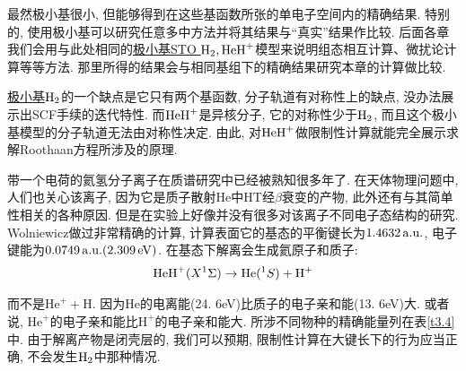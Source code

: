 最然极小基很小, 
但能够得到在这些基函数所张的单电子空间内的精确结果. 
特别的, 
使用极小基可以研究任意多中方法并将其结果与``真实''结果作比较. 
后面各章我们会用与此处相同的\underline{极小基STO $\mathrm{H}_2,\mathrm{HeH}^+$}模型来说明组态相互计算、微扰论计算等等方法. 
那里所得的结果会与相同基组下的精确结果研究本章的\hft 计算做比较.


\underline{极小基$\mathrm{H}_2$}的一个缺点是它只有两个基函数, 
分子轨道有对称性上的缺点, 没办法展示出SCF手续的迭代特性. 
而$\mathrm{HeH}^+$是异核分子, 它的对称性少于$\mathrm{H}_2$, 而且这个极小基模型的分子轨道无法由对称性决定. 
由此, 对$\mathrm{HeH}^+$做限制性\hft 计算就能完全展示求解Roothaan方程所涉及的原理. 

带一个电荷的氦氢分子离子在质谱研究中已经被熟知很多年了. 在天体物理问题中, 人们也关心该离子, 因为它是质子散射$\mathrm{He}$中$\mathrm{HT}$经$\beta$衰变的产物, 此外还有与其简单性相关的各种原因. 但是在实验上好像并没有很多对该离子不同电子态结构的研究. Wolniewicz做过非常精确的计算, 计算表面它的基态的平衡键长为$1.4632\,\mathrm{a.u.}$, 电子键能为$0.0749\,\mathrm{a.u.}(2.309\,\mathrm{eV})$. 在基态下解离会生成氦原子和质子:
\begin{align}
	\mathrm{HeH}^+(X^1\Sigma) \to \mathrm{He}(^1S) + \mathrm{H}^+
\end{align}

而不是$\mathrm{He}^+ + \mathrm{H}$. 
因为$\mathrm{He}$的电离能(24.
6eV)比质子的电子亲和能(13.
6eV)大. 
或者说, 
$\mathrm{He}^+$的电子亲和能比$\mathrm{H}^+$的电子亲和能大. 
所涉不同物种的精确能量列在表\ref{t3.4}中. 
由于解离产物是闭壳层的, 
我们可以预期, 
限制性\hft 计算在大键长下的行为应当正确, 
不会发生$\mathrm{H}_2$中那种情况. 

